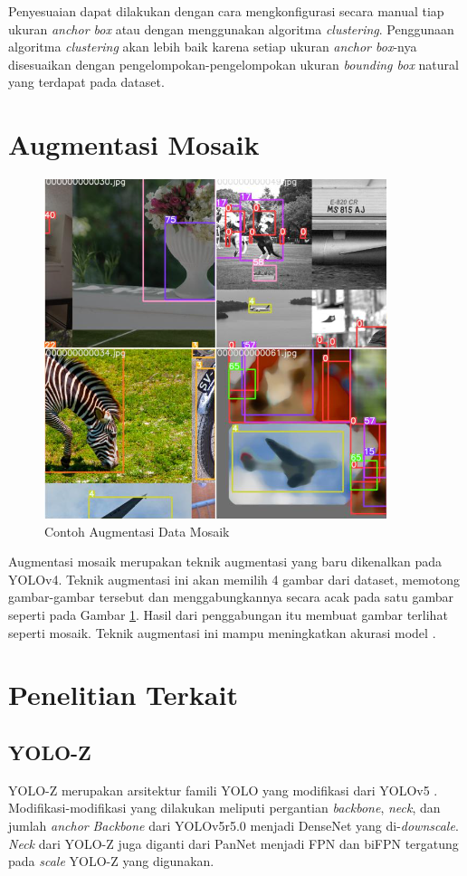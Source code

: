  Penyesuaian dapat dilakukan dengan cara mengkonfigurasi secara manual tiap ukuran \emph{anchor box} atau dengan menggunakan algoritma \emph{clustering}.
  Penggunaan algoritma \emph{clustering} akan lebih baik karena setiap ukuran \emph{anchor box}-nya disesuaikan dengan pengelompokan-pengelompokan ukuran \emph{bounding box} natural yang terdapat pada dataset.

\section{Augmentasi Mosaik}
  \begin{figure}[ht]
    \centering
    \includegraphics[scale=0.6]{pictures/mosaic-aug.png}
    \caption{Contoh Augmentasi Data Mosaik \parencite{yolov5}}
    \label{fig:mosaic}
  \end{figure}

  Augmentasi mosaik merupakan teknik augmentasi yang baru dikenalkan pada YOLOv4.
  Teknik augmentasi ini akan memilih 4 gambar dari dataset, memotong gambar-gambar tersebut dan menggabungkannya secara acak pada satu gambar seperti pada Gambar \ref{fig:mosaic}.
  Hasil dari penggabungan itu membuat gambar terlihat seperti mosaik.
  Teknik augmentasi ini mampu meningkatkan akurasi model \parencite{yolov4}.


\section{Penelitian Terkait}
  \subsection{YOLO-Z}
    YOLO-Z merupakan arsitektur famili YOLO yang modifikasi dari YOLOv5 \parencite{yoloz}.
    Modifikasi-modifikasi yang dilakukan meliputi pergantian \emph{backbone}, \emph{neck}, dan jumlah \emph{anchor}
    \emph{Backbone} dari YOLOv5r5.0 menjadi DenseNet yang di-\emph{downscale}.
    \emph{Neck} dari YOLO-Z juga diganti dari PanNet menjadi FPN dan biFPN tergatung pada \emph{scale} YOLO-Z yang digunakan.

